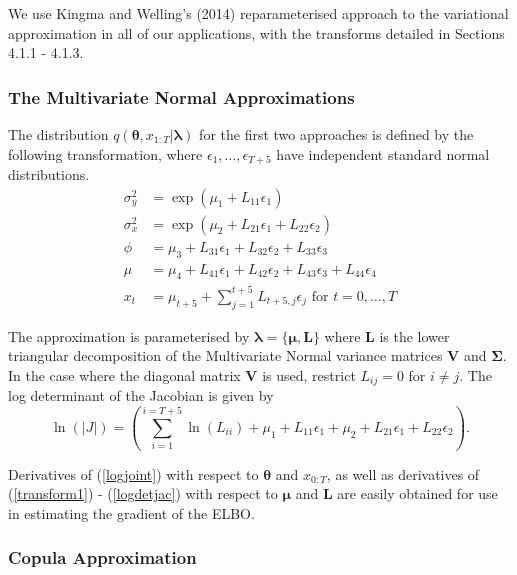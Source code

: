 \documentclass[12pt,a4paper]{article}%
\numberwithin{equation}{section}
\begin{document}
{{We use Kingma and Welling's (2014) reparameterised approach to the variational approximation in all of our applications, with the transforms detailed in Sections 4.1.1 - 4.1.3.

\subsubsection{The Multivariate Normal Approximations}

The distribution $q(\boldsymbol{\theta}, x_{1:T} | \boldsymbol{\lambda})$ for the first two approaches is defined by the following transformation, where $\epsilon_{1}, \dots, \epsilon_{T+5}$ have independent standard normal distributions.
\begin{align}
\sigma^2_y &= \exp(\mu_1 + L_{11} \epsilon_1)  \label{transform1} \\
\sigma^2_x &= \exp(\mu_2 + L_{21} \epsilon_1 + L_{22} \epsilon_2) \label{transform2} \\
\phi &= \mu_3 + L_{31} \epsilon_1 + L_{32} \epsilon_2 + L_{33} \epsilon_3 \label{transform3} \\
\mu &= \mu_4 + L_{41} \epsilon_1 + L_{42} \epsilon_2 + L_{43} \epsilon_3 + L_{44} \epsilon_4 \label{transform4} \\
x_t &= \mu_{t+5} + \sum_{j=1}^{t+5} L_{t+5, j} \epsilon_j \mbox{ for } t = 0, \dots, T \label{transform5} 
\end{align}

The approximation is parameterised by $\boldsymbol{\lambda} = \{ \boldsymbol{\mu}, \textbf{L} \}$ where $\textbf{L}$ is the lower triangular decomposition of the Multivariate Normal variance matrices $\textbf{V}$ and $\boldsymbol{\Sigma}$. In the case where the diagonal matrix $\textbf{V}$ is used, restrict $L_{ij} = 0$ for $i \neq j$.
The log determinant of the Jacobian is given by
\begin{equation}
\label{logdetjac}
\ln(|J|) = \left(\sum_{i = 1}^{i = T+5} \ln(L_{ii}) + \mu_1 + L_{11} \epsilon_1 + \mu_2 + L_{21} \epsilon_1 + L_{22} \epsilon_2\right).  
\end{equation}

Derivatives of (\ref{logjoint}) with respect to $\boldsymbol{\theta}$ and $x_{0:T}$, as well as derivatives of (\ref{transform1}) - (\ref{logdetjac}) with respect to $\boldsymbol{\mu}$ and $\textbf{L}$ are easily obtained for use in estimating the gradient of the ELBO.

\subsubsection{Copula Approximation}

}}
\end{document}

